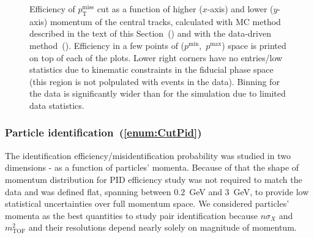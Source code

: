 \begin{figure}[h]
    \caption[Efficiency of $p_{\text{T}}^{\text{miss}}$ cut as a function of central tracks' momenta.]{Efficiency of $p_{\text{T}}^{\text{miss}}$ cut as a function of higher ($x$-axis) and lower ($y$-axis) momentum of the central tracks, calculated with MC method described in the text of this Section~() and with the data-driven method~(). Efficiency in a few points of ($p^{\text{min}}$,~$p^{\text{max}}$) space is printed on top of each of the plots. Lower right corners have no entries/low statistics due to kinematic constraints in the fiducial phase space (this region is not polpulated with events in the data). Binning for the data is significantly wider than for the simulation due to limited data statistics.}\label{fig:ptMissCutEff}%
\end{figure}


\subsubsection{Particle identification~(\ref{enum:CutPid})}\label{sec:pidEff}

The identification efficiency/misidentification probability was studied in two dimensions - as a function of particles' momenta. Because of that the shape of momentum distribution for PID efficiency study was not required to match the data and was defined flat, spanning between $0.2$~GeV and 3~GeV, to provide low statistical uncertainties over full momentum space. We considered particles' momenta as the best quantities to study pair identification because $n\sigma_{X}$ and $m^{2}_{\text{TOF}}$ and their resolutions depend nearly solely on magnitude of momentum.

